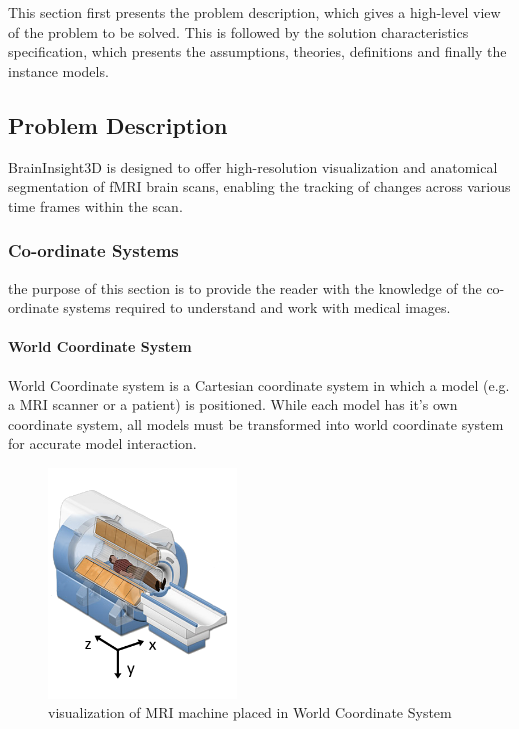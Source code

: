 \documentclass[12pt]{article}
\begin{document}
This section first presents the problem description, which gives a high-level
view of the problem to be solved.  This is followed by the solution characteristics
specification, which presents the assumptions, theories, definitions and finally
the instance models.

\subsection{Problem Description} \label{Sec_pd}

BrainInsight3D is designed to offer high-resolution visualization and anatomical
segmentation of fMRI brain scans, enabling the tracking of changes across various
time frames within the scan.

\subsubsection{Co-ordinate Systems}
the purpose of this section is to provide the reader with the knowledge of the co-ordinate systems
required to understand and work with medical images. \cite{Nejad2017}

\paragraph*{World Coordinate System}

World Coordinate system is a Cartesian coordinate system in which a model (e.g. a MRI scanner or a patient) is positioned.
While each model has it's own coordinate system, all models must be transformed into world coordinate system for accurate model interaction.
\begin{figure}[hbpt!]
  \centering
  \includegraphics[width=50mm]{world-coordinate-sytem.png}
  \caption{visualization of MRI machine placed in World Coordinate System~\cite{SlicerWikiCoordinateSystems}}
  \label{worldcoordfMRI}
\end{figure}
\end{document}

